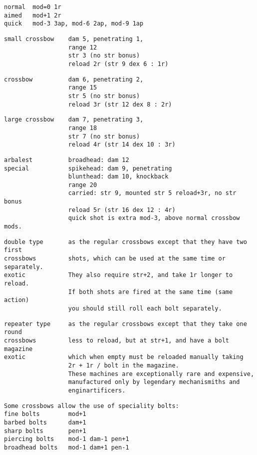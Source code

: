\begin{samepage}
\begin{verbatim}
normal  mod=0 1r
aimed   mod+1 2r
quick   mod-3 3ap, mod-6 2ap, mod-9 1ap
\end{verbatim} \blocklistgap \begin{verbatim}
small crossbow    dam 5, penetrating 1,
                  range 12
                  str 3 (no str bonus)
                  reload 2r (str 9 dex 6 : 1r)
\end{verbatim} \blocklistgap \begin{verbatim}
crossbow          dam 6, penetrating 2,
                  range 15
                  str 5 (no str bonus)
                  reload 3r (str 12 dex 8 : 2r)
\end{verbatim} \blocklistgap \begin{verbatim}
large crossbow    dam 7, penetrating 3,
                  range 18
                  str 7 (no str bonus)
                  reload 4r (str 14 dex 10 : 3r)
\end{verbatim} \blocklistgap \begin{verbatim}
arbalest          broadhead: dam 12
special           spikehead: dam 9, penetrating
                  blunthead: dam 10, knockback
                  range 20
                  carried: str 9, mounted str 5 reload+3r, no str bonus
                  reload 5r (str 16 dex 12 : 4r)
                  quick shot is extra mod-3, above normal crossbow mods.
\end{verbatim} \blocklistgap \begin{verbatim}
double type       as the regular crossbows except that they have two first
crossbows         shots, which can be used at the same time or separately.
exotic            They also require str+2, and take 1r longer to reload.
                  If both shots are fired at the same time (same action)
                  you should still roll each bolt separately.
\end{verbatim} \blocklistgap \begin{verbatim}
repeater type     as the regular crossbows except that they take one round
crossbows         less to reload, but at str+1, and have a bolt magazine
exotic            which when empty must be reloaded manually taking
                  2r + 1r / bolt in the magazine.
                  These machines are exceptionally rare and expensive, 
                  manufactured only by legendary mechanismiths and 
                  enginartificers.
\end{verbatim} \blocklistgap \begin{verbatim}
Some crossbows allow the use of speciality bolts:
fine bolts        mod+1
barbed bolts      dam+1
sharp bolts       pen+1
piercing bolts    mod-1 dam-1 pen+1
broadhead bolts   mod-1 dam+1 pen-1
\end{verbatim} \end{samepage} \normalsize \goodbreak

